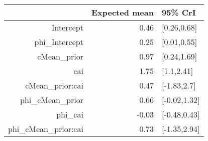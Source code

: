 \begin{tabular}{rrl}
  \hline
 & Expected mean & 95\% CrI \\ 
  \hline
Intercept & 0.46 & [0.26,0.68] \\ 
  phi\_Intercept & 0.25 & [0.01,0.55] \\ 
  cMean\_prior & 0.97 & [0.24,1.69] \\ 
  cai & 1.75 & [1.1,2.41] \\ 
  cMean\_prior:cai & 0.47 & [-1.83,2.7] \\ 
  phi\_cMean\_prior & 0.66 & [-0.02,1.32] \\ 
  phi\_cai & -0.03 & [-0.48,0.43] \\ 
  phi\_cMean\_prior:cai & 0.73 & [-1.35,2.94] \\ 
   \hline
\end{tabular}

